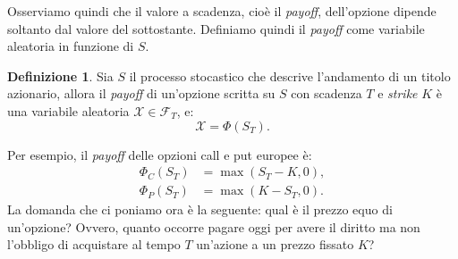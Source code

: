 \documentclass[a4paper,10pt]{report}
\theoremstyle{plain}
\theoremstyle{definition}
\newtheorem{definition}{Definizione}[chapter]
\theoremstyle{remark}
\begin{document}
Osserviamo quindi che il valore a scadenza, cio\`e il \emph{payoff}, dell'opzione dipende soltanto dal valore del sottostante. Definiamo quindi il
\emph{payoff} come variabile aleatoria in funzione di $S$.
\begin{definition}
Sia $S$ il processo stocastico che descrive l'andamento di un titolo azionario, allora il \emph{payoff} di un'opzione scritta su $S$ con scadenza $T$ e \emph{strike} $K$ \`e una variabile aleatoria $\mathcal{X}\in\mathcal{F}_T$, e: $$\mathcal{X}=\Phi(S_T).$$
\end{definition}
Per esempio, il \emph{payoff} delle opzioni call e put europee \`e:
\begin{align*}
\Phi_C(S_T)&=\max(S_T-K,0),\\
\Phi_P(S_T)&=\max(K-S_T,0).
\end{align*}
La domanda che ci poniamo ora \`e la seguente: qual \`e il prezzo equo di un'opzione? Ovvero, quanto occorre pagare oggi per avere il diritto ma non l'obbligo di acquistare al tempo $T$ un'azione a un prezzo fissato $K$?
\end{document}

